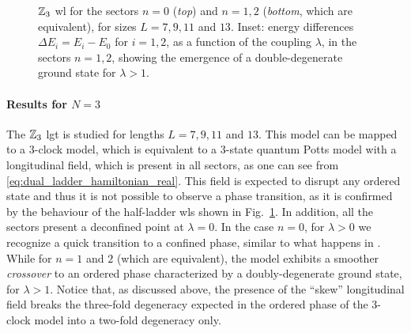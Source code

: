 \begin{figure}[t]
    \centering
    
    \vspace*{-10pt}
    \caption[\ac{wl}s for the $\Z_3$ ladder \ac{lgt}]{$\Z_3$ \ac{wl} for the sectors $n=0$ (\emph{top}) and $n=1,2$ (\emph{bottom}, which are equivalent), for sizes $L = 7,9,11$ and $13$.
       Inset: energy differences $\Delta E_i = E_i - E_0$ for $i=1,2$, as a function of the coupling $\lambda$, in the sectors $n=1,2$, showing the emergence of a double-degenerate ground state for $\lambda > 1$.
}
    \label{fig:z3_wilson}
\end{figure}


\smallskip

\paragraph{Results for \texorpdfstring{$N=3$}{N=3}}%
The $\Z_3$ \ac{lgt} is studied for lengths $L=7,9,11$ and $13$.
This model can be mapped to a $3$-clock model, which is equivalent to a $3$-state quantum Potts model with a longitudinal field, which is present in all sectors, as one can see from \eqref{eq:dual_ladder_hamiltonian_real}.
This field is expected to disrupt any ordered state and thus it is not possible to observe a phase transition, as it is confirmed  by the behaviour of the half-ladder \ac{wl}s  shown in Fig.~\ref{fig:z3_wilson}.
In addition, all the sectors present a deconfined point at $\lambda = 0$.
In the case $n=0$, for $\lambda > 0$ we recognize a quick transition to a confined phase, similar to what happens in \cite{burrello2021ladder}.
While for $n=1$ and $2$ (which are equivalent), the model exhibits a smoother \emph{crossover} to an ordered phase characterized by a doubly-degenerate ground state, for $\lambda > 1$.
Notice that, as discussed above,  the presence of the ``skew'' longitudinal field breaks the three-fold degeneracy expected in the ordered phase of the $3$-clock model into a two-fold degeneracy only.

\smallskip

